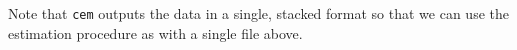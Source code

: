 \documentclass[11pt,titlepage]{article}
\newcommand{\cem}{\texttt{cem }}
\begin{document}
Note that \texttt{cem} outputs the data in a single, stacked format so that we
can use the estimation procedure as with a single file above. 














\end{document}
